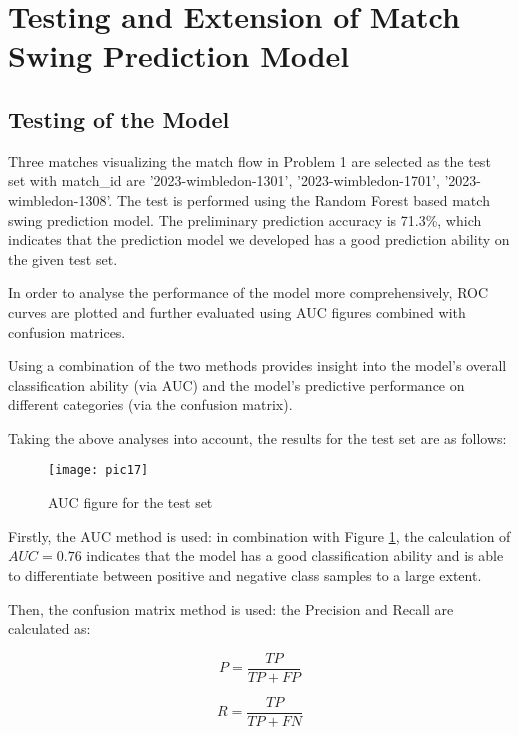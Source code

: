 \documentclass[12pt]{article}  %
\begin{document}
\section{Testing and Extension of Match Swing Prediction Model}

\subsection{Testing of the Model}
Three matches visualizing the match flow in Problem 1 are selected as the test set with match\_id are '2023-wimbledon-1301', '2023-wimbledon-1701', '2023-wimbledon-1308'. The test is performed using the Random Forest based match swing prediction model. The preliminary prediction accuracy is 71.3\%, which indicates that the prediction model we developed has a good prediction ability on the given test set.

In order to analyse the performance of the model more comprehensively, ROC curves are plotted and further evaluated using AUC figures combined with confusion matrices.



Using a combination of the two methods provides insight into the model's overall classification ability (via AUC) and the model's predictive performance on different categories (via the confusion matrix).

Taking the above analyses into account, the results for the test set are as follows:

\begin{figure}[htbp]  %
	\centering  %
	\texttt{[image: pic17]} %
	\caption{AUC figure for the test set}  
	\label{pic17}
\end{figure}


Firstly, the AUC method is used: in combination with Figure \ref{pic17}, the calculation of $AUC = 0.76$ indicates that the model has a good classification ability and is able to differentiate between positive and negative class samples to a large extent.

Then, the confusion matrix method is used: the Precision and Recall are calculated as:

\begin{equation}
	P=\frac{TP}{TP + FP}
\end{equation}

\begin{equation}
	R=\frac{TP}{TP + FN}
\end{equation}
\end{document}
